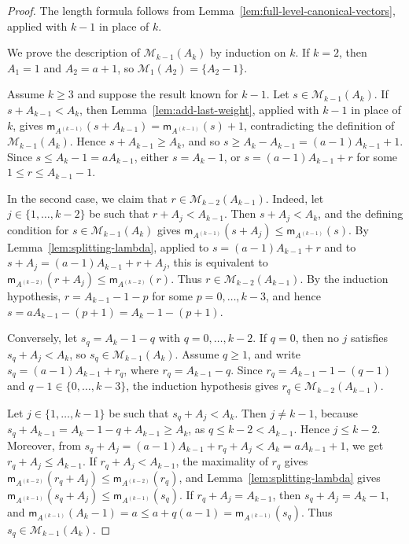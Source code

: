 \documentclass[12pt,a4paper]{amsart}
\theoremstyle{definition}
\begin{document}
\begin{proof}
The length formula follows from Lemma~\ref{lem:full-level-canonical-vectors}, applied with $k-1$ in place of $k$.

We prove the description of $\mathcal M_{k-1}(A_k)$ by induction on $k$. If $k=2$, then $A_1=1$ and $A_2=a+1$, so $\mathcal M_1(A_2)=\{A_2-1\}$.

Assume $k\ge 3$ and suppose the result known for $k-1$. Let $s\in\mathcal M_{k-1}(A_k)$. If $s+A_{k-1}<A_k$, then Lemma~\ref{lem:add-last-weight}, applied with $k-1$ in place of $k$, gives $\mathsf m_{A^{(k-1)}}(s+A_{k-1})=\mathsf m_{A^{(k-1)}}(s)+1$, contradicting the definition of $\mathcal M_{k-1}(A_k)$. Hence $s+A_{k-1}\ge A_k$, and so $s\ge A_k-A_{k-1}=(a-1)A_{k-1}+1$. Since $s\le A_k-1=aA_{k-1}$, either $s=A_k-1$, or $s=(a-1)A_{k-1}+r$ for some $1\le r\le A_{k-1}-1$.

In the second case, we claim that $r\in\mathcal M_{k-2}(A_{k-1})$. Indeed, let $j\in\{1,\ldots,k-2\}$ be such that $r+A_j<A_{k-1}$. Then $s+A_j<A_k$, and the defining condition for $s\in\mathcal M_{k-1}(A_k)$ gives $\mathsf m_{A^{(k-1)}}(s+A_j)\le \mathsf m_{A^{(k-1)}}(s)$. By Lemma~\ref{lem:splitting-lambda}, applied to $s=(a-1)A_{k-1}+r$ and to $s+A_j=(a-1)A_{k-1}+r+A_j$, this is equivalent to $\mathsf m_{A^{(k-2)}}(r+A_j)\le \mathsf m_{A^{(k-2)}}(r)$. Thus $r\in\mathcal M_{k-2}(A_{k-1})$. By the induction hypothesis, $r=A_{k-1}-1-p$ for some $p=0,\ldots,k-3$, and hence $s=aA_{k-1}-(p+1)=A_k-1-(p+1)$.

Conversely, let $s_q=A_k-1-q$ with $q=0,\ldots,k-2$. If $q=0$, then no $j$ satisfies $s_q+A_j<A_k$, so $s_q\in\mathcal M_{k-1}(A_k)$. Assume $q\ge 1$, and write $s_q=(a-1)A_{k-1}+r_q$, where $r_q=A_{k-1}-q$. Since $r_q=A_{k-1}-1-(q-1)$ and $q-1\in\{0,\ldots,k-3\}$, the induction hypothesis gives $r_q\in\mathcal M_{k-2}(A_{k-1})$.

Let $j\in\{1,\ldots,k-1\}$ be such that $s_q+A_j<A_k$. Then $j\ne k-1$, because $s_q+A_{k-1}=A_k-1-q+A_{k-1}\ge A_k$, as $q\le k-2<A_{k-1}$. Hence $j\le k-2$. Moreover, from $s_q+A_j=(a-1)A_{k-1}+r_q+A_j<A_k=aA_{k-1}+1$, we get $r_q+A_j\le A_{k-1}$. If $r_q+A_j<A_{k-1}$, the maximality of $r_q$ gives $\mathsf m_{A^{(k-2)}}(r_q+A_j)\le \mathsf m_{A^{(k-2)}}(r_q)$, and Lemma~\ref{lem:splitting-lambda} gives $\mathsf m_{A^{(k-1)}}(s_q+A_j)\le \mathsf m_{A^{(k-1)}}(s_q)$. If $r_q+A_j=A_{k-1}$, then $s_q+A_j=A_k-1$, and $\mathsf m_{A^{(k-1)}}(A_k-1)=a\le a+q(a-1)=\mathsf m_{A^{(k-1)}}(s_q)$. Thus $s_q\in\mathcal M_{k-1}(A_k)$.
\end{proof}
\end{document}
